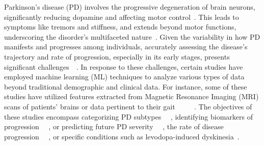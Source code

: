 Parkinson's disease (PD) involves the progressive degeneration of brain neurons, significantly reducing dopamine and affecting motor control~\cite{fahn_2003}. 
This leads to symptoms like tremors and stiffness, and extends beyond motor functions, underscoring the disorder's multifaceted nature~\cite{xia_yao_ye_cheng_2020}. 
Given the variability in how PD manifests and progresses among individuals, accurately assessing the disease's trajectory and rate of progression, especially in its 
early stages, presents significant challenges~\cite{saeed_compagnone_aviv_strafella_black_lang_masellis_2017}~\cite{seyed-mohammad_fereshtehnejad_yashar_zeighami_dagher_postuma_2017}. 
In response to these challenges, certain studies have employed machine learning (ML) techniques to analyze various types of data beyond traditional demographic and clinical data. 
For instance, some of these studies have utilized features extracted from Magnetic Resonance Imaging (MRI) scans of patients' brains or data pertinent to their gait
~\cite{xia_yao_ye_cheng_2020}~\cite{9207380}~\cite{salmanpour_mojtaba_shamsaei_ghasem_hajianfar_hamid_soltanian_zadeh_arman_rahmim_2022}
~\cite{oscar_pena_nogales_2019}. The objectives of these studies encompass categorizing PD subtypes~\cite{seyed-mohammad_fereshtehnejad_yashar_zeighami_dagher_postuma_2017}
~\cite{salmanpour_mojtaba_shamsaei_ghasem_hajianfar_hamid_soltanian_zadeh_arman_rahmim_2022}, identifying biomarkers of progression~\cite{oscar_pena_nogales_2019}
~\cite{burciu_ofori_archer_wu_pasternak_mcfarland_okun_vaillancourt_2017}, or predicting future PD severity~\cite{xia_yao_ye_cheng_2020}
~\cite{abbasi_seyed_mohammad_fereshtehnejad_yashar_zeighami_kevin_michel_herve_larcher_postuma_dagher_2020}, the rate of disease progression~\cite{shu2021predicting}
~\cite{wang_wu_brown_zhang_liu_han_zuo_cheng_feng_2022}, or specific conditions such as levodopa-induced dyskinesia~\cite{luo_chen_gui_2023}.

